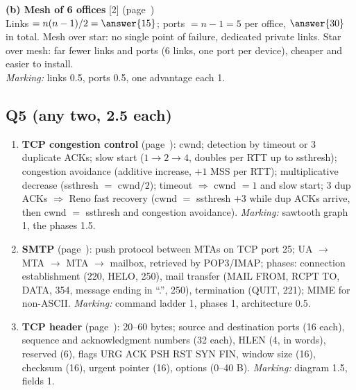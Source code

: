 \textbf{(b) Mesh of 6 offices} [2] \hfill (page~\pageref{iq:C05})\\
Links $=n(n-1)/2=\answer{15}$; ports $=n-1=5$ per office, $\answer{30}$ in total. Mesh over star: no single point of failure, dedicated private links. Star over mesh: far fewer links and ports (6 links, one port per device), cheaper and easier to install.\\
\textit{Marking:} links 0.5, ports 0.5, one advantage each 1.

\subsection*{Q5 (any two, 2.5 each)}
\begin{enumerate}[label=\textbf{(\roman*)},leftmargin=8mm]
\item \textbf{TCP congestion control} (page~\pageref{iq:C36}): cwnd; detection by timeout or 3 duplicate ACKs; slow start ($1\to2\to4$, doubles per RTT up to ssthresh); congestion avoidance (additive increase, $+1$ MSS per RTT); multiplicative decrease (ssthresh $=$ cwnd$/2$); timeout $\Rightarrow$ cwnd $=1$ and slow start; 3 dup ACKs $\Rightarrow$ Reno fast recovery (cwnd $=$ ssthresh $+3$ while dup ACKs arrive, then cwnd $=$ ssthresh and congestion avoidance). \textit{Marking:} sawtooth graph 1, the phases 1.5.
\item \textbf{SMTP} (page~\pageref{iq:C16}): push protocol between MTAs on TCP port 25; UA $\to$ MTA $\to$ MTA $\to$ mailbox, retrieved by POP3/IMAP; phases: connection establishment (220, HELO, 250), mail transfer (MAIL FROM, RCPT TO, DATA, 354, message ending in ``.'', 250), termination (QUIT, 221); MIME for non-ASCII. \textit{Marking:} command ladder 1, phases 1, architecture 0.5.
\item \textbf{TCP header} (page~\pageref{iq:C30}): 20--60 bytes; source and destination ports (16 each), sequence and acknowledgment numbers (32 each), HLEN (4, in words), reserved (6), flags URG ACK PSH RST SYN FIN, window size (16), checksum (16), urgent pointer (16), options (0--40 B). \textit{Marking:} diagram 1.5, fields 1.
\end{enumerate}


